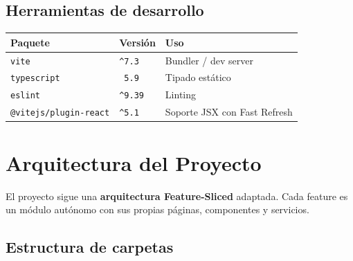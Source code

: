 \documentclass[12pt,letterpaper]{article}
\newcommand{\code}[1]{\texttt{#1}}
\begin{document}
\subsection{Herramientas de desarrollo}

\begin{longtable}{p{} p{} p{}}
\toprule
\textbf{Paquete} & \textbf{Versión} & \textbf{Uso} \\
\midrule
\code{vite} & \code{\string^7.3} & Bundler / dev server \\
\code{typescript} & \code{\string~5.9} & Tipado estático \\
\code{eslint} & \code{\string^9.39} & Linting \\
\code{@vitejs/plugin-react} & \code{\string^5.1} & Soporte JSX con Fast Refresh \\
\bottomrule
\end{longtable}

\section{Arquitectura del Proyecto}

El proyecto sigue una \textbf{arquitectura Feature-Sliced} adaptada. Cada feature es un módulo autónomo con sus propias páginas, componentes y servicios.

\subsection{Estructura de carpetas}
\end{document}
